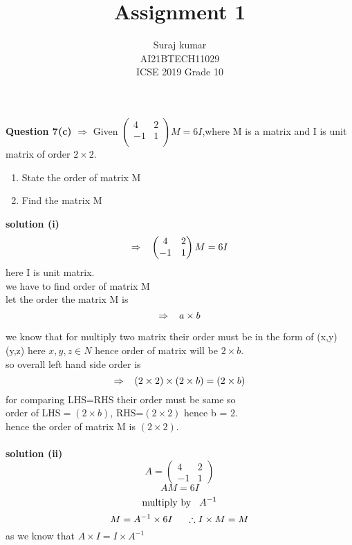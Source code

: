 \documentclass[journal,12pt,twocolumn]{IEEEtran}
\title{Assignment 1}
\author{Suraj kumar \\ \normalsize AI21BTECH11029\\\vspace*{20pt} \Large ICSE 2019 Grade 10}
\newcommand{\myvec}[1]{\ensuremath{\begin{pmatrix}#1\end{pmatrix}}}
\begin{document}
\maketitle
\textbf{Question 7(c)} $\Rightarrow$ Given $\myvec{
     4 & 2 \\
     -1 & 1 \\
      }M=6I $,where M is a matrix and I is unit matrix of order $2\times 2.$
		\begin{enumerate}[label=(\roman*)]
		\item State the order of matrix M
		\item Find the matrix M
	\end{enumerate}	
 \textbf{solution (i) } 
 \begin{equation}
  \Rightarrow  \hspace{3mm} \myvec{
     4 & 2 \\
     -1 & 1 
      }M=6I
      \end{equation}
    here I is unit matrix.\\
    we have to find order of matrix M\\
    let the order the matrix M is  $$ \Rightarrow \hspace{3mm} a\times b$$
      
      we know that for multiply two matrix their order must be in the form of  (x,y) (y,z)  here $x,y,z \in N$
      hence order of matrix will be $2\times b$.\\
      so overall left hand side order is  $$\Rightarrow \hspace{3mm} (2\times 2)\times(2\times b) =(2\times b)$$
      for comparing LHS=RHS their order must be same so \\
      order of LHS$=(2\times b)$,
      RHS=$(2\times 2)$  hence b = 2.\\
      hence the order of matrix M is $(2\times 2).$\\\\

\textbf{solution (ii)}\\
\begin{equation}
    A=\myvec{
      4 & 2\\
      -1 & 1
     }
     \end{equation}
     \begin{equation}
       AM=6I
     \end{equation}
    \begin{equation}
    \text{multiply by}\hspace{3mm} A^{-1}
    \end{equation}
    \begin{equation}
    M=A^{-1}\times 6I \hspace{5mm} \therefore I\times M=M
    \end{equation}
    as we know that  $A \times I=I\times A^{-1}$
    
\end{document}
